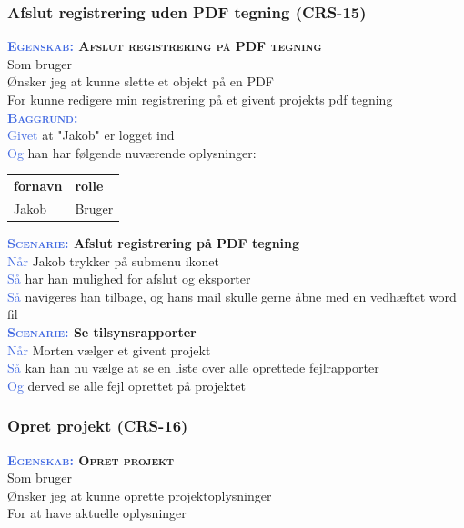 \subsubsection{Afslut registrering uden PDF tegning (CRS-15)} \label{sec:USAfslutRegUdenPDF}
\textbf{\textsc{\textcolor{RoyalBlue}{Egenskab:} Afslut registrering på PDF tegning}}\\
Som bruger\\
Ønsker jeg at kunne slette et objekt på en PDF\\
For kunne redigere min registrering på et givent projekts pdf tegning\\

\textsc{\textcolor{RoyalBlue}{\textbf{Baggrund:}}}\\
\textcolor{RoyalBlue}{Givet} at "Jakob" er logget ind\\
\textcolor{RoyalBlue}{Og} han har følgende nuværende oplysninger:\\
\begin{tabular}{| l | l |}
	\textbf{fornavn} & \textbf{rolle} \\
	Jakob & Bruger\\
\end{tabular}

\textbf{\textsc{\textcolor{RoyalBlue}{Scenarie:}} Afslut registrering på PDF tegning}\\
\textcolor{RoyalBlue}{Når} Jakob trykker på submenu ikonet\\
\textcolor{RoyalBlue}{Så}  har han mulighed for afslut og eksporter\\
\textcolor{RoyalBlue}{Så}  navigeres han tilbage, og hans mail skulle gerne åbne med en vedhæftet word fil\\


\textbf{\textsc{\textcolor{RoyalBlue}{Scenarie:}} Se tilsynsrapporter}\\
\textcolor{RoyalBlue}{Når} Morten vælger et givent projekt\\
\textcolor{RoyalBlue}{Så} kan han nu vælge at se en liste over alle oprettede fejlrapporter\\
\textcolor{RoyalBlue}{Og} derved se alle fejl oprettet på projektet\\


\subsubsection{Opret projekt (CRS-16)} \label{sec:USOpretProjekt}
\textbf{\textsc{\textcolor{RoyalBlue}{Egenskab:} Opret projekt}}\\
Som bruger\\
Ønsker jeg at kunne oprette projektoplysninger\\
For at have aktuelle oplysninger


